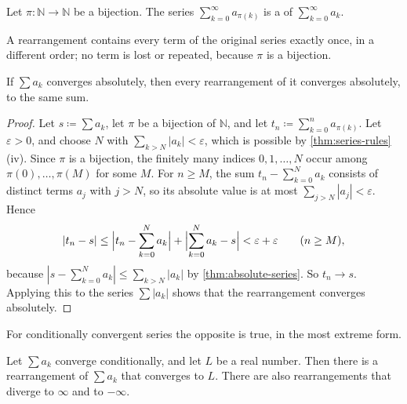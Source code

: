 \begin{definition}[Rearrangement]
\label{def:rearrangement}
Let $\pi\colon\mathbb N\to\mathbb N$ be a bijection. The series $\sum_{k=0}^\infty a_{\pi(k)}$ is a  of $\sum_{k=0}^\infty a_k$.
\end{definition}

A rearrangement contains every term of the original series exactly once, in a different order; no term is lost or repeated, because $\pi$ is a bijection.

\begin{theorem}
\label{thm:rearrangement-absolute}
If $\sum a_k$ converges absolutely, then every rearrangement of it converges absolutely, to the same sum.
\end{theorem}

\begin{proof}
Let $s\coloneqq\sum a_k$, let $\pi$ be a bijection of $\mathbb N$, and let $t_n\coloneqq\sum_{k=0}^na_{\pi(k)}$. Let $\varepsilon>0$, and choose $N$ with $\sum_{k>N}|a_k|<\varepsilon$, which is possible by \cref{thm:series-rules}\,(iv). Since $\pi$ is a bijection, the finitely many indices $0,1,\ldots,N$ occur among $\pi(0),\ldots,\pi(M)$ for some $M$. For $n\ge M$, the sum $t_n-\sum_{k=0}^Na_k$ consists of distinct terms $a_j$ with $j>N$, so its absolute value is at most $\sum_{j>N}|a_j|<\varepsilon$. Hence
\[
|t_n-s|\le\Bigl|t_n-\sum_{k=0}^Na_k\Bigr|+\Bigl|\sum_{k=0}^Na_k-s\Bigr|<\varepsilon+\varepsilon\qquad(n\ge M),
\]
because $|s-\sum_{k=0}^Na_k|\le\sum_{k>N}|a_k|$ by \cref{thm:absolute-series}. So $t_n\to s$. Applying this to the series $\sum|a_k|$ shows that the rearrangement converges absolutely.
\end{proof}

For conditionally convergent series the opposite is true, in the most extreme form.

\begin{theorem}
\label{thm:riemann-rearrangement}
Let $\sum a_k$ converge conditionally, and let $L$ be a real number. Then there is a rearrangement of $\sum a_k$ that converges to $L$. There are also rearrangements that diverge to $\infty$ and to $-\infty$.
\end{theorem}

